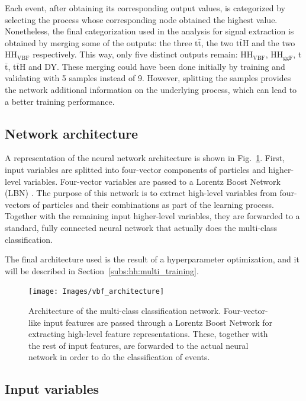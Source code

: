 \documentclass[../main.tex]{subfiles}
\begin{document}
Each event, after obtaining its corresponding output values, is categorized by selecting the process whose corresponding node obtained the highest value. Nonetheless, the final categorization used in the analysis for signal extraction is obtained by merging some of the outputs: the three t$\bar{\text{t}}$, the two t$\bar{\text{t}}$H and the two $\text{HH}_{\text{VBF}}$ respectively. This way, only five distinct outputs remain: $\text{HH}_{\text{VBF}}$, $\text{HH}_{\text{ggF}}$, t$\bar{\text{t}}$, t$\bar{\text{t}}$H and DY. These merging could have been done initially by training and validating with 5 samples instead of 9. However, splitting the samples provides the network additional information on the underlying process, which can lead to a better training performance.

\subsection{Network architecture}

A representation of the neural network architecture is shown in Fig.~\ref{fig:hh:multi_architecture}. First, input variables are splitted into four-vector components of particles and higher-level variables. Four-vector variables are passed to a Lorentz Boost Network (LBN) \cite{hh:analysis:lbn}.
The purpose of this network is to extract high-level variables from four-vectors of particles and their combinations as part of the learning process. Together with the remaining input higher-level variables, they are forwarded to a standard, fully connected neural network that actually does the multi-class classification.

The final architecture used is the result of a hyperparameter optimization, and it will be described in Section~\ref{subs:hh:multi_training}.


\begin{figure}[h!]
\texttt{[image: Images/vbf\_architecture]}
\caption{Architecture of the multi-class classification network. Four-vector-like input features are passed through a Lorentz Boost Network for extracting high-level feature representations. These, together with the rest of input features, are forwarded to the actual neural network in order to do the classification of events.}
\label{fig:hh:multi_architecture}
\end{figure}

\subsection{Input variables}
\end{document}
